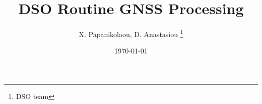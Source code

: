 \documentclass[oneside]{report}
\title{DSO Routine GNSS Processing}
\author{X. Papanikolaou, D. Anastasiou \thanks{DSO team}}
\date{\today}
\begin{document}
\begin{titlepage}
\maketitle
\end{titlepage}

\tableofcontents
\listoffigures
\listoftables






\printindex
\end{document}

